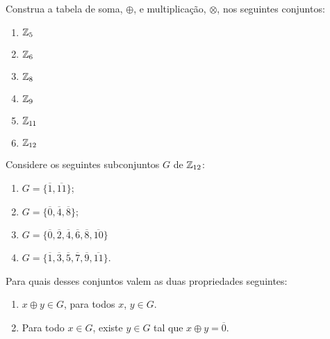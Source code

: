 \documentclass[12pt]{exam}
\begin{document}
    \vspace{.6cm}

     \questao{} Construa a tabela de soma, $\oplus$, e multiplicação, $\otimes$, nos seguintes conjuntos:
      \begin{multicols}{3}
        \begin{enumerate}[label=({\alph*})]
            \item $\mathbb{Z}_5$
            \item $\mathbb{Z}_6$
          \item $\mathbb{Z}_8$
          \item $\mathbb{Z}_9$
          \item $\mathbb{Z}_{11}$
          \item $\mathbb{Z}_{12}$
      \end{enumerate}
    \end{multicols}

    \vspace{.3cm}

    \questao{} Considere os seguintes subconjuntos $G$ de $\mathbb{Z}_{12}$:
    \begin{multicols}{2}
      \begin{enumerate}[label=({\alph*})]
          \item $G=\{\overline{1},\overline{11}\}$;

          \item $G=\{\overline{0},\overline{4},\overline{8}\}$;

          \item $G=\{\overline{0},\overline{2},\overline{4},\overline{6},\overline{8},\overline{10}\}$

          \item $G=\{\overline{1}, \overline{3},\overline{5},\overline{7},\overline{9},\overline{11}\}$.
      \end{enumerate}
    \end{multicols}

    Para quais desses conjuntos valem as duas propriedades seguintes:
    \begin{enumerate}[label=({\roman*})]
      \item $x \oplus y \in G$, para todos $x$, $y \in G$.
      \item Para todo $x \in G$, existe $y \in G$ tal que $x \oplus y = \overline{0}$.
    \end{enumerate}

    \vspace{.3cm}
\end{document}
